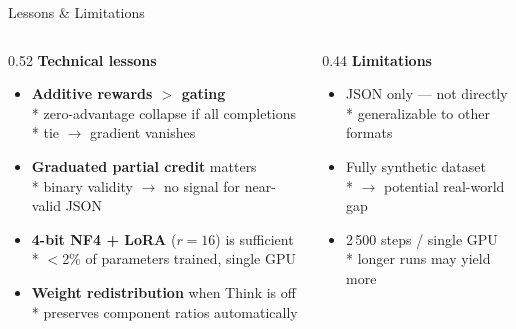 \documentclass[10pt, aspectratio=169]{beamer}
\begin{document}
\begin{frame}{Lessons \& Limitations}
  \begin{columns}[T]
    \begin{column}{0.52\textwidth}
      \textbf{Technical lessons}
      \begin{itemize}
        \setlength\itemsep{0.5em}
        \item \textbf{Additive rewards $>$ gating}\\*
              zero-advantage collapse if all completions\\* tie $\to$ gradient vanishes
        \item \textbf{Graduated partial credit} matters\\*
              binary validity $\to$ no signal for near-valid JSON
        \item \textbf{4-bit NF4 + LoRA} ($r{=}16$) is sufficient\\*
              $<$2\% of parameters trained, single GPU
        \item \textbf{Weight redistribution} when Think is off\\*
              preserves component ratios automatically
      \end{itemize}
    \end{column}
    \begin{column}{0.44\textwidth}
      \textbf{Limitations}
      \begin{itemize}
        \setlength\itemsep{0.5em}
        \item JSON only — not directly\\*
              generalizable to other formats
        \item Fully synthetic dataset\\*
              $\rightarrow$ potential real-world gap
        \item 2\,500 steps / single GPU\\*
              longer runs may yield more
      \end{itemize}
    \end{column}
  \end{columns}
\end{frame}
\end{document}
